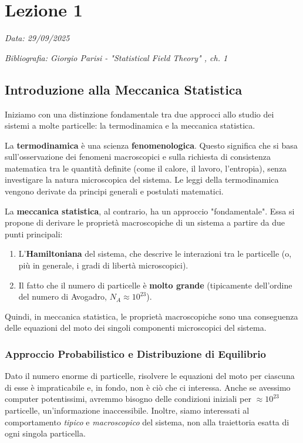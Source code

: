 \chapter{Lezione 1}
\label{chap:lezione_01} %

\begin{flushright}
\textit{Data: 29/09/2025}
\end{flushright}
\textit{Bibliografia: Giorgio Parisi - "Statistical Field Theory" , ch. 1}


\section{Introduzione alla Meccanica Statistica}

Iniziamo con una distinzione fondamentale tra due approcci allo studio dei sistemi a molte particelle: la termodinamica e la meccanica statistica.

La \textbf{termodinamica} è una scienza \textbf{fenomenologica}. Questo significa che si basa sull'osservazione dei fenomeni macroscopici e sulla richiesta di consistenza matematica tra le quantità definite (come il calore, il lavoro, l'entropia), senza investigare la natura microscopica del sistema. Le leggi della termodinamica vengono derivate da principi generali e postulati matematici.

La \textbf{meccanica statistica}, al contrario, ha un approccio "fondamentale". Essa si propone di derivare le proprietà macroscopiche di un sistema a partire da due punti principali:
\begin{enumerate}
    \item L'\textbf{Hamiltoniana} del sistema, che descrive le interazioni tra le particelle (o, più in generale, i gradi di libertà microscopici).
    \item Il fatto che il numero di particelle è \textbf{molto grande} (tipicamente dell'ordine del numero di Avogadro, $N_A \approx 10^{23}$).
\end{enumerate}
Quindi, in meccanica statistica, le proprietà macroscopiche sono una conseguenza delle equazioni del moto dei singoli componenti microscopici del sistema.

\subsection{Approccio Probabilistico e Distribuzione di Equilibrio}

Dato il numero enorme di particelle, risolvere le equazioni del moto per ciascuna di esse è impraticabile e, in fondo, non è ciò che ci interessa. Anche se avessimo computer potentissimi, avremmo bisogno delle condizioni iniziali per $\approx 10^{23}$ particelle, un'informazione inaccessibile. Inoltre, siamo interessati al comportamento \textit{tipico} e \textit{macroscopico} del sistema, non alla traiettoria esatta di ogni singola particella.

